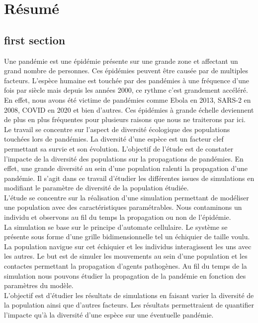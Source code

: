 \chapter{Résumé} \label{ch:resume}

\section{first section}
Une pandémie est une épidémie présente sur une grande zone et affectant un grand nombre de personnes. Ces épidémies peuvent être causée par de multiples facteurs. L'espèce humaine est touchée par des pandémies à une fréquence d'une fois par siècle mais depuis les années 2000, ce rythme c'est grandement accéléré. En effet, nous avons été victime de pandémies comme Ebola en 2013, SARS-2 en 2008, COVID en 2020 et bien d'autres. Ces épidémies à grande échelle deviennent de plus en plus fréquentes pour plusieurs raisons que nous ne traiterons par ici.\\

Le travail se concentre sur l'aspect de diversité écologique des populations touchées lors de pandémies. La diversité d'une espèce est un facteur clef permettant sa survie et son évolution. L'objectif de l'étude est de constater l'impacte de la diversité des populations sur la propagations de pandémies. En effet, une grande diversité au sein d'une population ralenti la propagation d'une pandémie. Il s'agit dans ce travail d'étudier les différentes issues de simulations en modifiant le paramètre de diversité de la population étudiée.\\

L'étude se concentre sur la réalisation d'une simulation permettant de modéliser une population avec des caractéristiques paramétrables. Nous contaminons un individu et observons au fil du temps la propagation ou non de l'épidémie.\\

La simulation se base sur le principe d'automate cellulaire. Le système se présente sous forme d'une grille bidimensionnelle tel un échiquier de taille voulu. La population navigue sur cet échiquier et les individus interagissent les uns avec les autres. Le but est de simuler les mouvements au sein d'une population et les contactes permettant la propagation d'agents pathogènes. Au fil du temps de la simulation nous pouvons étudier la propagation de la pandémie en fonction des paramètres du modèle.\\

L'objectif est d'étudier les résultats de simulations en faisant varier la diversité de la population ainsi que d'autres facteurs. Les résultats permettraient de quantifier l'impacte qu'à la diversité d'une espèce sur une éventuelle pandémie.
